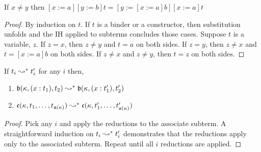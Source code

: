 \begin{lemma}
    If $x \neq y$ then $[x := a][y := b]t = [y := [x := a]b][x := a]t$
    \label{lem:2:subst_commute}
\end{lemma}
\begin{proof}
    By induction on $t$.
    If $t$ is a binder or a constructor, then substitution unfolds and the IH applied to subterms concludes those cases.
    Suppose $t$ is a variable, $z$.
    If $z = x$, then $z \neq y$ and $t = a$ on both sides.
    If $z = y$, then $z \neq x$ and $t = [x := a]b$ on both sides.
    If $z \neq x$ and $z \neq y$, then $t = z$ on both sides.
\end{proof}

\begin{lemma}
    If $t_i \leadsto^* t_i^\prime$ for any $i$ then,
    \begin{enumerate}
        \item $\mathfrak{b}(\kappa, (x : t_1), t_2) \leadsto^* \mathfrak{b}(\kappa, (x : t_1^\prime), t_2^\prime)$
        \item $\mathfrak{c}(\kappa, t_1,\ldots,t_{\mathfrak{a}(\kappa)}) \leadsto^* \mathfrak{c}(\kappa, t_1^\prime,\ldots,t_{\mathfrak{a}(\kappa)}^\prime)$
    \end{enumerate}
    \label{lem:2:beta_par}
\end{lemma}
\begin{proof}
    Pick any $i$ and apply the reductions to the associate subterm.
    A straightforward induction on $t_i \leadsto^* t_i^\prime$ demonstrates that the reductions apply only to the associated subterm.
    Repeat until all $i$ reductions are applied.
\end{proof}

